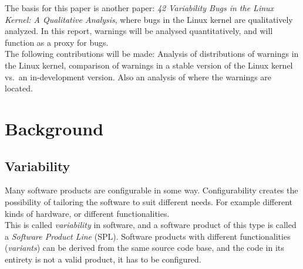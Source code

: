 \documentclass[a4paper,11pt]{report}
\begin{document}
The basis for this paper is another  paper: \emph{42 Variability 
Bugs in the Linux Kernel: A Qualitative Analysis}\cite{42bugs}, where bugs in 
the Linux kernel are qualitatively analyzed. In this report, warnings will be 
analysed quantitatively, and will function as a proxy for bugs.
\\

The following contributions will be made: Analysis of distributions of warnings 
in the Linux kernel, comparison of warnings in a stable version of the Linux 
kernel vs.\ an in-development version. Also an analysis of where the warnings 
are located.

\newpage
        \chapter{Background}

            \section{Variability}

Many software products are configurable in some way. Configurability creates the 
possibility of tailoring the software to suit different needs. For example 
different kinds of hardware, or different functionalities. 
\\

This is called \emph{variability} in software, and a software product of 
this type is called a \emph{Software Product Line} (SPL). Software products 
with different functionalities (\emph{variants}) can be derived from the same 
source code base, and the code in its entirety is not a valid product\cite[p. 
1]{IntDatSPL}, it has to be configured.
\\

        \def \fn {14,387 across all architectures, with an average of 9,984 per 
        architecture, and 10,335 for the \texttt{x86} architecture, which is used
        in this project.}
\end{document}
